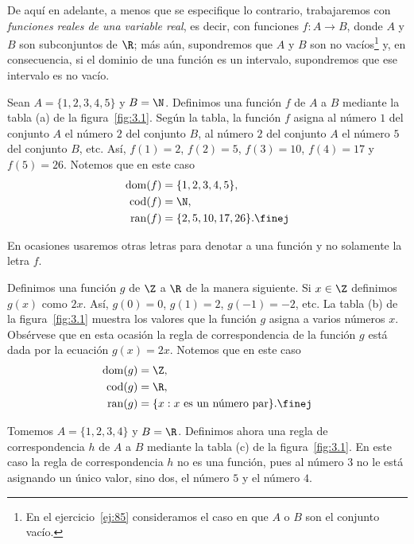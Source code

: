 \documentclass[12pt,a4paper]{book}
\DeclareMathOperator{\dom}{dom}
\DeclareMathOperator{\cod}{cod}
\DeclareMathOperator{\ran}{ran}
\begin{document}
    De aquí en adelante, a menos que se especifique lo contrario, trabajaremos
    con \textit{funciones reales de una variable real}, es decir, con funciones $f:A\to B$,
    donde $A$ y $B$ son subconjuntos de $\R$; más aún, supondremos que $A$ y $B$ son
    no vacíos\footnote{En el ejercicio~\ref{ej:85} consideramos el caso en que $A$ o $B$ son el conjunto vacío.} y, en consecuencia, si el dominio de una función es un intervalo,
    supondremos que ese intervalo es no vacío.

    \begin{ejemplo}\label{ejm:5}
        Sean $A=\{1,2,3,4,5\}$ y $B=\N$. Definimos una función $f$ de
        $A$ a $B$ mediante la tabla (a) de la figura~\ref{fig:3.1}. Según la tabla, la función $f$
        asigna al número $1$ del conjunto $A$ el número $2$ del conjunto $B$, al número
        $2$ del conjunto $A$ el número $5$ del conjunto $B$, etc. Así, $f(1)=2$, $f(2)=5$,
        $f(3)=10$, $f(4)=17$ y $f(5)=26$. Notemos que en este caso
        \begin{align*}
            \dom(f)&=\{1,2,3,4,5\},\\
            \cod(f)&=\N,\\
            \ran(f)&=\{2,5,10,17,26\}.\finej
        \end{align*}
    \end{ejemplo}

    En ocasiones usaremos otras letras para denotar a una función y no solamente
    la letra $f$.

    \begin{ejemplo}\label{ejm:6}
        Definimos una función $g$ de $\Z$ a $\R$ de la manera siguiente. Si
        $x\in\Z$ definimos $g(x)$ como $2x$. Así, $g(0)=0$, $g(1)=2$, $g(-1)=-2$, etc. La
        tabla (b) de la figura~\ref{fig:3.1} muestra los valores que la función $g$ asigna a varios
        números $x$. Obsérvese que en esta ocasión la regla de correspondencia de la
        función $g$ está dada por la ecuación $g(x)=2x$. Notemos que en este caso
        \begin{align*}
            \dom(g)&=\Z,\\
            \cod(g)&=\R,\\
            \ran(g)&=\{x:x\text{ es un número par}\}.\finej
        \end{align*}
    \end{ejemplo}

    \begin{ejemplo}\label{ejm:7}
        Tomemos $A=\{1,2,3,4\}$ y $B=\R$. Definimos ahora una regla de correspondencia
        $h$ de $A$ a $B$ mediante la tabla (c) de la figura~\ref{fig:3.1}. En este caso la
        regla de correspondencia $h$ no es una función, pues al número $3$ no le está
        asignando un único valor, sino dos, el número $5$ y el número $4$.
    \end{ejemplo}
\end{document}
